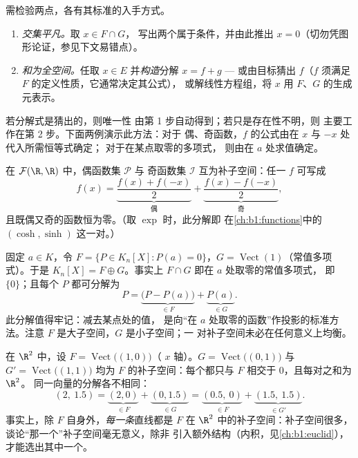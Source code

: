 \begin{method}[证明 $E = F \oplus G$]
\label{met:b1:vspaces:directsum}
需检验两点，各有其标准的入手方式。
\begin{enumerate}
  \item \emph{交集平凡。}取 $x \in F \cap G$，
        写出两个属于条件，并由此推出 $x =
        0$（切勿凭图形论证，参见下文易错点）。
  \item \emph{和为全空间。}任取 $x \in E$
        并\emph{构造}分解 $x = f + g$ ---
        或由目标猜出 $f$（$f$ 须满足
        $F$ 的定义性质，它通常决定其公式），
        或解线性方程组，将 $x$
        用 $F$、$G$ 的生成元表示。
\end{enumerate}
若分解式是猜出的，则唯一性
由第 1 步自动得到；若只是存在性不明，则
主要工作在第 2 步。下面两例演示此方法：对于
偶、奇函数，$f$ 的公式由在 $x$ 与 $-x$ 处代入所需恒等式确定；
对于在某点取零的多项式，
则由在 $a$ 处求值确定。
\end{method}

\begin{example}\label{ex:b1:vspaces:evenodd}
在 $\mathcal{F}(\R, \R)$ 中，偶函数集 $\mathcal{P}$ 与
奇函数集 $\mathcal{I}$ 互为补子空间：任一 $f$ 可写成
\[
f(x) = \underbrace{\frac{f(x) + f(-x)}{2}}_{\text{偶}}
+ \underbrace{\frac{f(x) - f(-x)}{2}}_{\text{奇}},
\]
且既偶又奇的函数恒为零。（取 $\exp$ 时，此分解即
在\cref{ch:b1:functions}中的 $(\cosh, \sinh)$ 这一对。）
\end{example}

\begin{example}[{$K_n[X]$ 中的一对补子空间}]
\label{ex:b1:vspaces:hyperplane}
固定 $a \in K$，令 $F = \{P \in K_n[X] : P(a) = 0\}$，$G =
\operatorname{Vect}(1)$（常值多项式）。于是 $K_n[X] = F \oplus
G$。事实上 $F \cap G$ 即在 $a$ 处取零的常值多项式，
即\ $\{0\}$；且每个 $P$ 都可分解为
\[
P = \underbrace{\bigl(P - P(a)\bigr)}_{\in F}
+ \underbrace{P(a)}_{\in G} .
\]
此分解值得牢记：减去某点处的值，
是向“在
$a$ 处取零的函数”作投影的标准方法。注意 $F$ 是大子空间，$G$ 是小子空间；一
对补子空间未必在任何意义上均衡。
\end{example}

\begin{example}[补子空间从不唯一]
\label{ex:b1:vspaces:manysupplements}
在 $\R^2$ 中，设 $F = \operatorname{Vect}\bigl((1,0)\bigr)$（
$x$ 轴）。$G = \operatorname{Vect}\bigl((0,1)\bigr)$ 与
$G' = \operatorname{Vect}\bigl((1,1)\bigr)$ 均为
$F$ 的补子空间：每个都只与 $F$ 相交于 $0$，且每对之和为 $\R^2$。
同一向量的分解各不相同：
\[
(2,\ 1.5) = \underbrace{(2, 0)}_{\in F} +
\underbrace{(0, 1.5)}_{\in G}
= \underbrace{(0.5,\ 0)}_{\in F} +
\underbrace{(1.5,\ 1.5)}_{\in G'} .
\]
事实上，除 $F$ 自身外，\emph{每一条}直线都是
$F$ 在 $\R^2$ 中的补子空间：补子空间很多，
谈论“那一个”补子空间毫无意义，除非
引入额外结构（内积，见\cref{ch:b1:euclid}），
才能选出其中一个。
\end{example}

